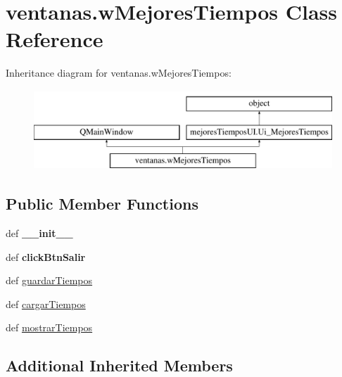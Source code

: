 \hypertarget{classventanas_1_1w_mejores_tiempos}{\section{ventanas.\-w\-Mejores\-Tiempos Class Reference}
\label{classventanas_1_1w_mejores_tiempos}
}
Inheritance diagram for ventanas.\-w\-Mejores\-Tiempos\-:\begin{figure}[H]
\begin{center}
\leavevmode
\includegraphics[height=3.000000cm]{classventanas_1_1w_mejores_tiempos}
\end{center}
\end{figure}
\subsection*{Public Member Functions}
\begin{DoxyCompactItemize}
\item 
\hypertarget{classventanas_1_1w_mejores_tiempos_a9144362cf6259852285fdf4b0f7ab39b}{def {\bfseries \-\_\-\-\_\-init\-\_\-\-\_\-}}\label{classventanas_1_1w_mejores_tiempos_a9144362cf6259852285fdf4b0f7ab39b}

\item 
\hypertarget{classventanas_1_1w_mejores_tiempos_a1d1586af2cb7d6e4b16fc14b963a7b33}{def {\bfseries click\-Btn\-Salir}}\label{classventanas_1_1w_mejores_tiempos_a1d1586af2cb7d6e4b16fc14b963a7b33}

\item 
def \hyperlink{classventanas_1_1w_mejores_tiempos_a4a22501803f7b0dfef0fae412d16eddd}{guardar\-Tiempos}
\item 
def \hyperlink{classventanas_1_1w_mejores_tiempos_a913d4d800d0492c403cf5668646ee629}{cargar\-Tiempos}
\item 
def \hyperlink{classventanas_1_1w_mejores_tiempos_a7a3c86fec7473b1b05266a69bb418a9a}{mostrar\-Tiempos}
\end{DoxyCompactItemize}
\subsection*{Additional Inherited Members}


